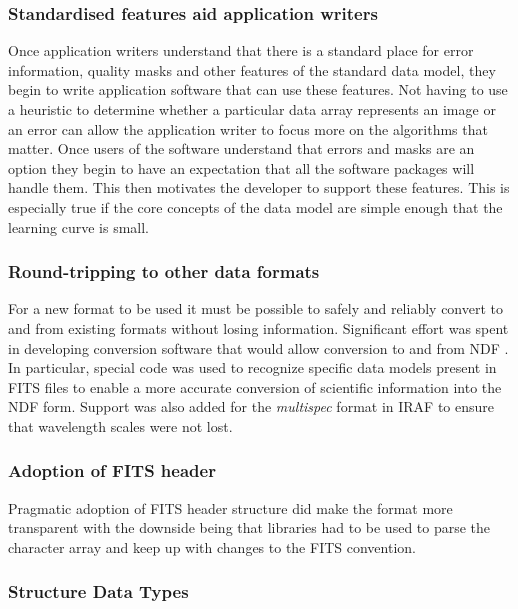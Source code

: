 \documentclass[final,authoryear,5p,times,twocolumn]{elsarticle}
\begin{document}
{\subsubsection{Standardised features aid application writers}

Once application writers understand that there is a standard place for
error information, quality masks and other features of the standard
data model, they begin to write application software that can use
these features. Not having to use a heuristic to determine whether a
particular data array represents an image or an error can allow the
application writer to focus more on the algorithms that matter. Once
users of the software understand that errors and masks are an option
they begin to have an expectation that all the software packages will
handle them. This then motivates the developer to support these
features.  This is especially true if the core concepts of the data
model are simple enough that the learning curve is small.

\subsubsection{Round-tripping to other data formats}

For a new format to be used it must be possible to safely and reliably
convert to and from existing formats without losing information.
Significant effort was spent in developing conversion software that
would allow conversion to and from NDF
\citep{SUN55,1997STARB..19...14C}. In particular, special code was
used to recognize specific data models present in FITS files to enable
a more accurate conversion of scientific information into the NDF
form. Support was also added for the \emph{multispec} format in IRAF
\citep{1993ASPC...52..467V} to ensure that wavelength scales were not
lost.

\subsubsection{Adoption of FITS header}

Pragmatic adoption of FITS header structure did make the format more
transparent with the downside being that libraries had to be used to
parse the character array and keep up with changes to the FITS
convention.

\subsubsection{Structure Data Types}

}
\end{document}
